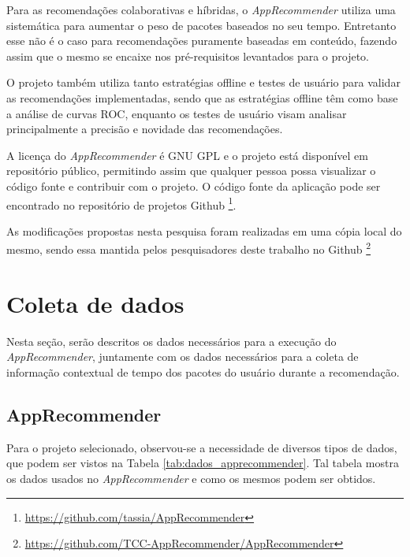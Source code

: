   Para as recomendações colaborativas e híbridas, o \textit{AppRecommender}
  utiliza uma sistemática para aumentar o peso de pacotes baseados no seu tempo.
  Entretanto esse não é o caso para recomendações puramente baseadas em conteúdo,
  fazendo assim que o mesmo se encaixe nos pré-requisitos levantados para o
  projeto.

  O projeto também utiliza tanto estratégias offline e testes de usuário para
  validar as recomendações implementadas, sendo que as estratégias offline têm como
  base a análise de curvas ROC, enquanto os testes de usuário visam analisar
  principalmente a precisão e novidade das recomendações.

  A licença do \textit{AppRecommender} é GNU GPL e o projeto está disponível em repositório
  público, permitindo assim que qualquer pessoa possa visualizar o código fonte e
  contribuir com o projeto. O código fonte da aplicação pode ser encontrado no
  repositório de projetos Github \footnote{\url{https://github.com/tassia/AppRecommender}}.

  As modificações propostas nesta pesquisa foram realizadas em uma cópia local do
  mesmo, sendo essa mantida pelos pesquisadores deste trabalho no Github \footnote{\url{https://github.com/TCC-AppRecommender/AppRecommender}}

  \section{Coleta de dados}

  Nesta seção, serão descritos os dados necessários para a execução do
  \textit{AppRecommender}, juntamente com os dados necessários para a coleta de
  informação contextual de tempo dos pacotes do usuário durante a
  recomendação.

  \subsection{AppRecommender}

  Para o projeto selecionado, observou-se a necessidade de diversos tipos
  de dados, que podem ser vistos na Tabela
  \ref{tab:dados_apprecommender}. Tal tabela mostra os dados usados no
  \textit{AppRecommender} e como os mesmos podem ser obtidos.


